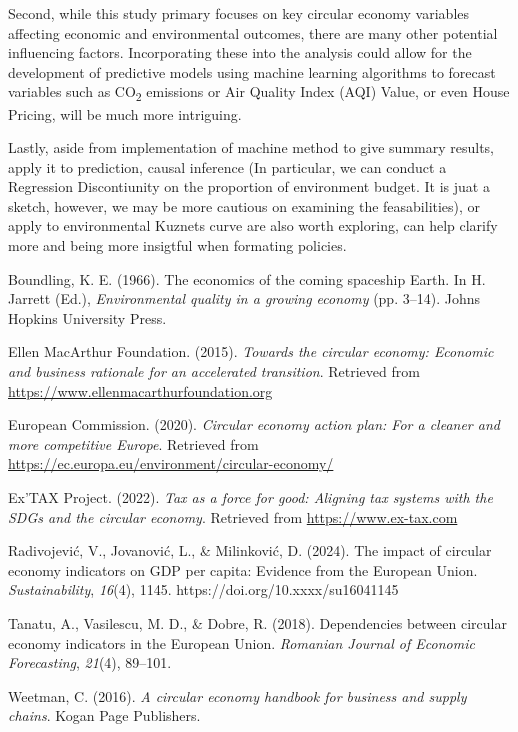 \documentclass{article}
\begin{document}
Second, while this study primary focuses on key circular economy variables affecting economic and environmental outcomes, there are many other potential influencing factors. 
Incorporating these into the analysis could allow for the development of predictive models using machine learning algorithms to forecast variables such as CO\textsubscript{2} emissions or Air Quality Index (AQI) Value, or even House Pricing, will be much more intriguing.

Lastly, aside from implementation of machine method to give summary results, apply it to prediction, causal inference (In particular, we can conduct a Regression Discontiunity on the proportion of environment budget. It is juat a sketch, however, we may be more cautious on examining the feasabilities), or apply to environmental Kuznets curve are also worth exploring, can help clarify more and being more insigtful when formating policies.
\newpage


\begin{thebibliography}{}

Boundling, K. E. (1966). The economics of the coming spaceship Earth. In H. Jarrett (Ed.), \textit{Environmental quality in a growing economy} (pp. 3–14). Johns Hopkins University Press.

Ellen MacArthur Foundation. (2015). \textit{Towards the circular economy: Economic and business rationale for an accelerated transition}. Retrieved from \url{https://www.ellenmacarthurfoundation.org}

European Commission. (2020). \textit{Circular economy action plan: For a cleaner and more competitive Europe}. Retrieved from \url{https://ec.europa.eu/environment/circular-economy/}

Ex'TAX Project. (2022). \textit{Tax as a force for good: Aligning tax systems with the SDGs and the circular economy}. Retrieved from \url{https://www.ex-tax.com}

Radivojević, V., Jovanović, L., \& Milinković, D. (2024). The impact of circular economy indicators on GDP per capita: Evidence from the European Union. \textit{Sustainability}, \textit{16}(4), 1145. https://doi.org/10.xxxx/su16041145

Tanatu, A., Vasilescu, M. D., \& Dobre, R. (2018). Dependencies between circular economy indicators in the European Union. \textit{Romanian Journal of Economic Forecasting}, \textit{21}(4), 89–101.

Weetman, C. (2016). \textit{A circular economy handbook for business and supply chains}. Kogan Page Publishers.

\end{thebibliography}
\end{document}
